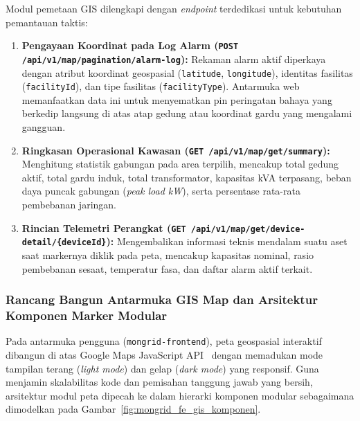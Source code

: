 Modul pemetaan GIS dilengkapi dengan \textit{endpoint} terdedikasi untuk kebutuhan pemantauan taktis:
\begin{enumerate}[label=\arabic*., leftmargin=*, itemsep=0pt]
  \item \textbf{Pengayaan Koordinat pada Log Alarm (\texttt{POST /api/v1/map/pagination/alarm-log}):} Rekaman alarm aktif diperkaya dengan atribut koordinat geospasial (\texttt{latitude}, \texttt{longitude}), identitas fasilitas (\texttt{facilityId}), dan tipe fasilitas (\texttt{facilityType}). Antarmuka web memanfaatkan data ini untuk menyematkan pin peringatan bahaya yang berkedip langsung di atas atap gedung atau koordinat gardu yang mengalami gangguan.
  \item \textbf{Ringkasan Operasional Kawasan (\texttt{GET /api/v1/map/get/summary}):} Menghitung statistik gabungan pada area terpilih, mencakup total gedung aktif, total gardu induk, total transformator, kapasitas kVA terpasang, beban daya puncak gabungan (\textit{peak load kW}), serta persentase rata-rata pembebanan jaringan.
  \item \textbf{Rincian Telemetri Perangkat (\texttt{GET /api/v1/map/get/device-detail/\{deviceId\}}):} Mengembalikan informasi teknis mendalam suatu aset saat markernya diklik pada peta, mencakup kapasitas nominal, rasio pembebanan sesaat, temperatur fasa, dan daftar alarm aktif terkait.
\end{enumerate}

\subsubsection{Rancang Bangun Antarmuka GIS Map dan Arsitektur Komponen Marker Modular}

Pada antarmuka pengguna (\texttt{mongrid-frontend}), peta geospasial interaktif dibangun di atas Google Maps JavaScript API~\cite{google_maps_js} dengan memadukan mode tampilan terang (\textit{light mode}) dan gelap (\textit{dark mode}) yang responsif. Guna menjamin skalabilitas kode dan pemisahan tanggung jawab yang bersih, arsitektur modul peta dipecah ke dalam hierarki komponen modular sebagaimana dimodelkan pada Gambar~\ref{fig:mongrid_fe_gis_komponen}.

